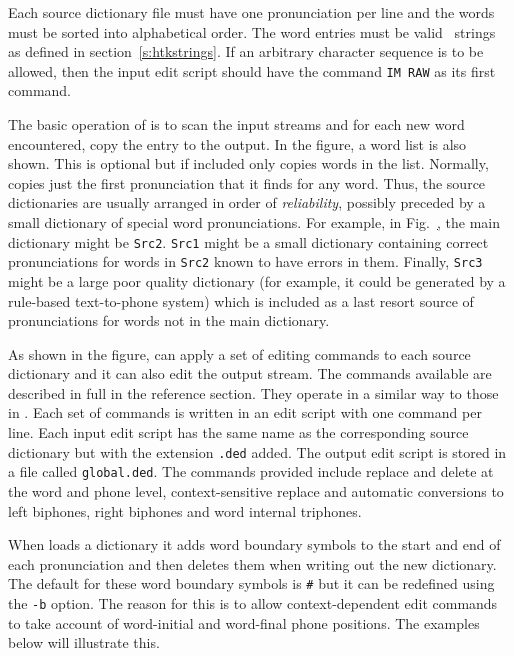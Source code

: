 Each source dictionary file must have one pronunciation per line and the
words must be sorted into alphabetical order.  The word entries must be
valid \HTK\ strings as defined in section~\ref{s:htkstrings}.  If an
arbitrary character sequence is to be allowed, then the input edit
script should have the command \texttt{IM RAW} as its first command.

The basic operation of 
 is to scan the input streams and for each new word
encountered, copy the entry to the output.  In the figure,  a word list
is also shown.  This is optional but if included 
 only copies words in the list.  Normally, 
copies just the first pronunciation that it finds for any word. Thus,
the source dictionaries are usually arranged in order of
\textit{reliability}, possibly preceded by a small dictionary of special
word pronunciations. For example, in Fig.~\href{f:dmaker}, the main
dictionary might be \texttt{Src2}.  \texttt{Src1} might be a small 
dictionary containing correct pronunciations for words in \texttt{Src2}
known to have  errors in them. Finally, \texttt{Src3} might be a large
poor quality dictionary (for example, it could be generated
by a rule-based text-to-phone system) which is included as a last resort
source of pronunciations for words not in the main dictionary.

As shown in the figure,  can apply a set of editing
commands to each source dictionary and it can also edit the
output stream.  The commands available are described in full in
the reference section.  They operate in a similar way to
those in .  Each set of commands is written in
an edit script with one command per line.  Each input edit script
has the same name as the corresponding source dictionary but with
the extension \texttt{.ded} added.  The output edit script is stored
in a file called \texttt{global.ded}.  
The commands provided
include replace and delete at the word and phone level, context-sensitive
replace and automatic conversions to left biphones, right biphones
and word internal triphones.

When  loads a dictionary it adds word boundary symbols to
the start and end of each pronunciation and then deletes them when
writing out the new dictionary.  The default for these word boundary
symbols is \texttt{\#} but it can be redefined using the \texttt{-b}
option.  The reason for this is to allow context-dependent edit commands 
to take account of word-initial and word-final phone positions.  
The examples below will illustrate this.

